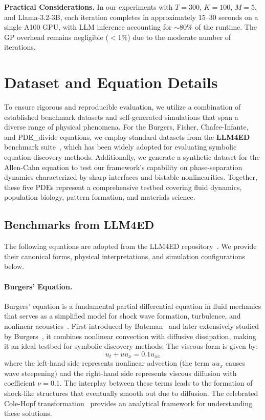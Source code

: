 \documentclass[twoside,11pt]{article}
\let\cite\citep
\newcommand{\1}{{\bf 1}}
\newcommand{\0}{{\bf 0}}
\begin{document}
\textbf{Practical Considerations.} In our experiments with $T=300$, $K=100$, $M=5$, and Llama-3.2-3B, each iteration completes in approximately 15--30 seconds on a single A100 GPU, with LLM inference accounting for $\sim$80\% of the runtime. The GP overhead remains negligible ($<$1\%) due to the moderate number of iterations.

\section{Dataset and Equation Details}
\label{app:data}

To ensure rigorous and reproducible evaluation, we utilize a combination of established benchmark datasets and self-generated simulations that span a diverse range of physical phenomena. For the Burgers, Fisher, Chafee-Infante, and PDE\_divide equations, we employ standard datasets from the \textbf{LLM4ED} benchmark suite~\cite{du2024llm4ed}, which has been widely adopted for evaluating symbolic equation discovery methods. Additionally, we generate a synthetic dataset for the Allen-Cahn equation to test our framework's capability on phase-separation dynamics characterized by sharp interfaces and bistable nonlinearities. Together, these five PDEs represent a comprehensive testbed covering fluid dynamics, population biology, pattern formation, and materials science.



\subsection{Benchmarks from LLM4ED}

The following equations are adopted from the LLM4ED repository~\cite{du2024llm4ed}. We provide their canonical forms, physical interpretations, and simulation configurations below.

\paragraph{Burgers' Equation.} 
Burgers' equation is a fundamental partial differential equation in fluid mechanics that serves as a simplified model for shock wave formation, turbulence, and nonlinear acoustics~\cite{burgers1948mathematical,whitham2011linear}. First introduced by Bateman~\cite{bateman1915some} and later extensively studied by Burgers~\cite{burgers1948mathematical}, it combines nonlinear convection with diffusive dissipation, making it an ideal testbed for symbolic discovery methods. The viscous form is given by:
\begin{equation}
    u_t + u u_x = 0.1 u_{xx}
\end{equation}
where the left-hand side represents nonlinear advection (the term $u u_x$ causes wave steepening) and the right-hand side represents viscous diffusion with coefficient $\nu = 0.1$. The interplay between these terms leads to the formation of shock-like structures that eventually smooth out due to diffusion. The celebrated Cole-Hopf transformation~\cite{cole1951quasi,hopf1950partial} provides an analytical framework for understanding these solutions.
\end{document}
